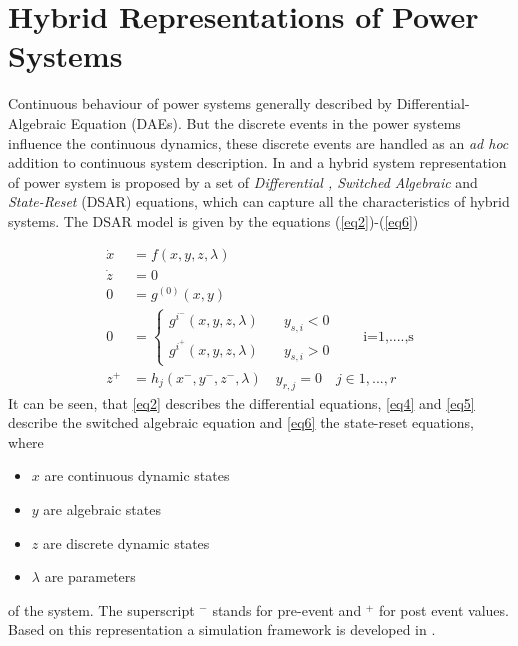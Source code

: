 \documentclass{article}	%
\author{Mohammed Ahsan Adib Murad, ID: 16203295}
\title{}
\date{\parbox{\linewidth}{\centering%
  \today\endgraf\bigskip\center
  \endgraf\medskip
   \endgraf
  University College Dublin}}
\begin{document}
\maketitle			%

\section{Hybrid Representations of Power Systems}

Continuous behaviour of power systems generally described by Differential-Algebraic Equation (DAEs). But the discrete events in the power systems influence the continuous dynamics, these discrete events are handled as an \textit{ad hoc} addition to continuous system description.
In \cite{H1} and \cite{H2} a hybrid system representation of power system is proposed by a set of \textit{Differential , Switched Algebraic} and \textit{State-Reset} (DSAR) equations, which can capture all the characteristics of hybrid systems. The DSAR model is given by the equations (\ref{eq2})-(\ref{eq6})

\begin{align}
\dot{x}                    & = f(x,y,z,\lambda) \label{eq2} \\
\dot{z}                    & = 0 \label{eq3}                \\
0                          & =g^{(0)}(x,y) \label{eq4}      \\
0                          & = \begin{cases}
    g^{i^-}(x,y,z,\lambda) & \quad y_{s,i} < 0              \\
    g^{i^+}(x,y,z,\lambda) & \quad y_{s,i} > 0
  \end{cases}
  \qquad \text{i=1,....,s} \label{eq5}                      \\
z^+                        & = h_j(x^-,y^-,z^-,\lambda) \quad y_{r,j}=0 \quad j\in {1,...,r} \label{eq6}
\end{align}
It can be seen, that \eqref{eq2} describes the differential equations, \eqref{eq4} and \eqref{eq5} describe the switched algebraic equation and \eqref{eq6} the state-reset equations, where
\begin{itemize}
\item $x$ are continuous dynamic states
\item $y$ are algebraic states
\item $z$ are discrete dynamic states
\item $\lambda$ are parameters
\end{itemize}
of the system. The superscript $^-$ stands for pre-event and $^+$ for post event values. Based on this representation a simulation framework is developed in \cite{turhum}.
\end{document}
